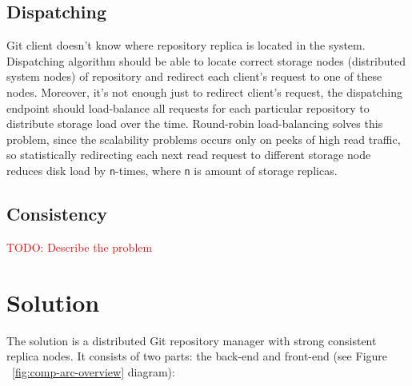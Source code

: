 \documentclass[12pt,oneside]{article}
\newcommand{\code}[1]{\texttt{#1}}
\newcommand{\todo}[1]{\textcolor{red}{TODO: #1}}
\begin{document}
\subsection{Dispatching}

Git client doesn't know where repository replica is located in the system. Dispatching algorithm
should be able to locate correct storage nodes (distributed system nodes) of repository and redirect
each client's request to one of these nodes. Moreover, it's not enough just to redirect client's request,
the dispatching endpoint should load-balance all requests for each particular repository to distribute
storage load over the time. Round-robin load-balancing solves this problem, since the scalability problems
occurs only on peeks of high read traffic, so statistically redirecting each next read request to
different storage node reduces disk load by \code{n}-times, where \code{n} is amount of storage replicas.

\subsection{Consistency}

\todo{Describe the problem}


\section{Solution}

The solution is a distributed Git repository manager with strong consistent replica nodes.
It consists of two parts: the back-end and front-end (see Figure ~\ref{fig:comp-arc-overview} diagram):
\end{document}
